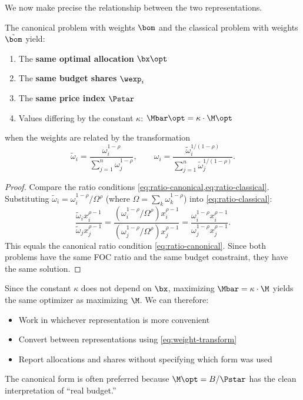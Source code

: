 We now make precise the relationship between the two representations.

\begin{proposition}
\label{prop:equivalence}
The canonical problem with weights $\bom$ and the classical problem with weights $\tilde{\bom}$ yield:
\begin{enumerate}[label=(\roman*)]
    \item The \textbf{same optimal allocation} $\bx\opt$
    \item The \textbf{same budget shares} $\wexp_i$
    \item The \textbf{same price index} $\Pstar$
    \item Values differing by the constant $\kappa$: $\Mbar\opt = \kappa \cdot \M\opt$
\end{enumerate}
when the weights are related by the transformation
\begin{equation}
\tilde{\omega}_i = \frac{\omega_i^{1-\rho}}{\sum_{j=1}^{n} \omega_j^{1-\rho}}, \qquad \omega_i = \frac{\tilde{\omega}_i^{1/(1-\rho)}}{\sum_{j=1}^{n} \tilde{\omega}_j^{1/(1-\rho)}}.
\label{eq:weight-transform}
\end{equation}
\end{proposition}

\begin{proof}
Compare the ratio conditions \cref{eq:ratio-canonical,eq:ratio-classical}. Substituting $\tilde{\omega}_i = \omega_i^{1-\rho}/\Omega^\rho$ (where $\Omega = \sum_k \omega_k^{1-\rho}$) into \cref{eq:ratio-classical}:
\[
\frac{\tilde{\omega}_i x_i^{\rho-1}}{\tilde{\omega}_j x_j^{\rho-1}} = \frac{(\omega_i^{1-\rho}/\Omega^\rho) x_i^{\rho-1}}{(\omega_j^{1-\rho}/\Omega^\rho) x_j^{\rho-1}} = \frac{\omega_i^{1-\rho} x_i^{\rho-1}}{\omega_j^{1-\rho} x_j^{\rho-1}}.
\]
This equals the canonical ratio condition \cref{eq:ratio-canonical}. Since both problems have the same FOC ratio and the same budget constraint, they have the same solution.
\end{proof}

\begin{calloutimportant}
Since the constant $\kappa$ does not depend on $\bx$, maximizing $\Mbar = \kappa \cdot \M$ yields the same optimizer as maximizing $\M$. We can therefore:
\begin{itemize}[nosep]
    \item Work in whichever representation is more convenient
    \item Convert between representations using \cref{eq:weight-transform}
    \item Report allocations and shares without specifying which form was used
\end{itemize}
The canonical form is often preferred because $\M\opt = B/\Pstar$ has the clean interpretation of ``real budget.''
\end{calloutimportant}


